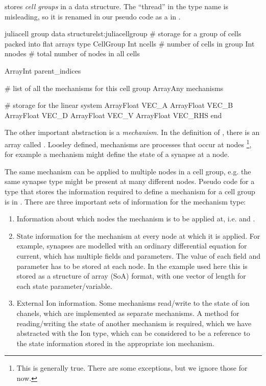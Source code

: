 \neuron stores \emph{cell groups} in a  data structure. The ``thread'' in the type name is misleading, so it is renamed in our pseudo code as a  in .

\begin{inlinelisting}{julia}{cell group data structure}{lst:juliacellgroup}
# storage for a group of cells packed into flat arrays
type CellGroup
  Int ncells    # number of cells in group
  Int nnodes    # total number of nodes in all cells

  Array{Int} parent_indices

  # list of all the mechanisms for this cell group
  Array{Any} mechanisms

  # storage for the linear system
  Array{Float} VEC_A
  Array{Float} VEC_B
  Array{Float} VEC_D
  Array{Float} VEC_V
  Array{Float} VEC_RHS
end
\end{inlinelisting}

The other important abstraction is a \emph{mechanism}. In the definition of , there is an array called . Loosley defined, mechanisms are processes that occur at nodes \footnote{This is generally true. There are some exceptions, but we ignore those for now.}, for example a mechanism might define the state of a synapse at a node.

The same mechanism can be applied to multiple nodes in a cell group, e.g. the same synapse type might be present at many different nodes. Pseudo code for a type that stores the information required to define a mechanism for a cell group is in .  There are three important sets of information for the mechanism type:
\begin{enumerate}
    \item
        Information about which nodes the mechanism is to be applied at, i.e.  and .
    \item
        State information for the mechanism at every node at which it is applied. For example, synapses are modelled with an ordinary differential equation for current, which has multiple fields and parameters. The value of each field and parameter has to be stored at each node. In the example used here this is stored as a structure of array (SoA) format, with one vector of length  for each state parameter/variable.
    \item
        External Ion information.
        Some mechanisms read/write to the state of ion chanels, which are implemented as separate mechanisms.
        A method for reading/writing the state of another mechanism is required, which we have abstracted with the Ion type, which can be considered to be a reference to the state information stored in the appropriate ion mechanism.
\end{enumerate}

